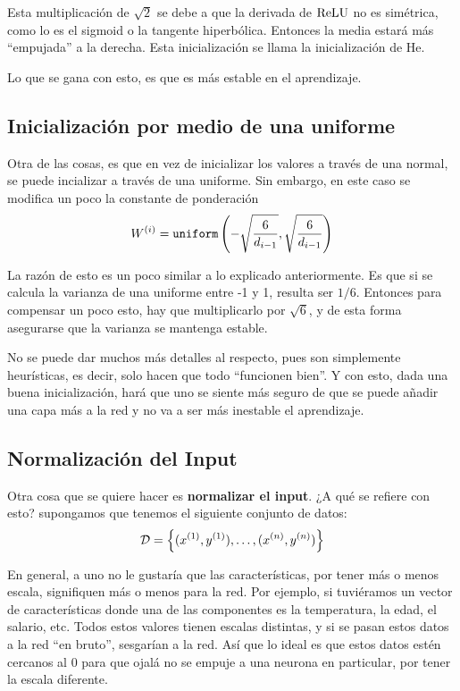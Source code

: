 Esta multiplicación de $\sqrt{2}$ se debe a que la derivada de $\relu$ no es simétrica, como lo es el sigmoid o la tangente hiperbólica. Entonces la media estará más ``empujada'' a la derecha. Esta inicialización se llama la inicialización de He.

Lo que se gana con esto, es que es más estable en el aprendizaje.

\subsection{Inicialización por medio de una uniforme}

Otra de las cosas, es que en vez de inicializar los valores a través de una normal, se puede incializar a través de una uniforme. Sin embargo, en este caso se modifica un poco la constante de ponderación
\begin{equation*}
    W\entr = \text{\texttt{uniform}}\left(-\sqrt{\frac{6}{d_{i-1}}}, \sqrt{\frac{6}{d_{i-1}}}\right)
\end{equation*}

La razón de esto es un poco similar a lo explicado anteriormente. Es que si se calcula la varianza de una uniforme entre -1 y 1, resulta ser $1/6$. Entonces para compensar un poco esto, hay que multiplicarlo por $\sqrt{6}$, y de esta forma asegurarse que la varianza se mantenga estable.

No se puede dar muchos más detalles al respecto, pues son simplemente heurísticas, es decir, solo hacen que todo ``funcionen bien''. Y con esto, dada una buena inicialización, hará que uno se siente más seguro de que se puede añadir una capa más a la red y no va a ser más inestable el aprendizaje.

\subsection{Normalización del Input}

Otra cosa que se quiere hacer es \textbf{normalizar el input}. ¿A qué se refiere con esto? supongamos que tenemos el siguiente conjunto de datos:
\begin{equation*}
    \mathcal{D} = \conj{(x\entr[1], y\entr[1]), \ldots, (x\entr[n], y\entr[n])}
\end{equation*}

En general, a uno no le gustaría que las características, por tener más o menos escala, signifiquen más o menos para la red. Por ejemplo, si tuviéramos un vector de características donde una de las componentes es la temperatura, la edad, el salario, etc. Todos estos valores tienen escalas distintas, y si se pasan estos datos a la red ``en bruto'', sesgarían a la red. Así que lo ideal es que estos datos estén cercanos al 0 para que ojalá no se empuje a una neurona en particular, por tener la escala diferente.

